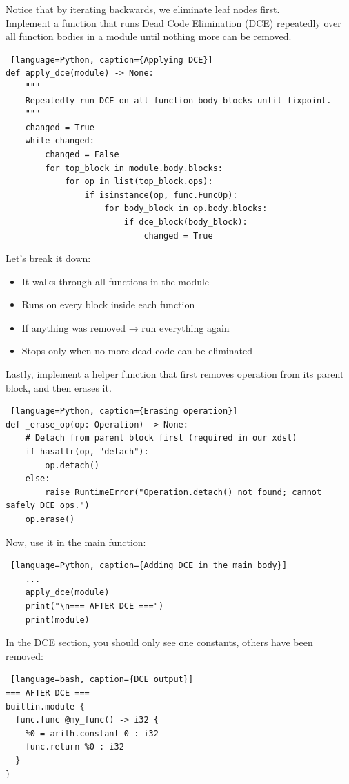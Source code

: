 \documentclass[../main.tex]{subfiles}
\begin{document}
Notice that by iterating backwards, we eliminate leaf nodes first.
\\Implement a function that runs Dead Code Elimination (DCE) repeatedly over all
function bodies in a module until nothing more can be removed.
\begin{lstlisting} [language=Python, caption={Applying DCE}]
def apply_dce(module) -> None:
    """
    Repeatedly run DCE on all function body blocks until fixpoint.
    """
    changed = True
    while changed:
        changed = False
        for top_block in module.body.blocks:
            for op in list(top_block.ops):
                if isinstance(op, func.FuncOp):
                    for body_block in op.body.blocks:
                        if dce_block(body_block):
                            changed = True
\end{lstlisting}
Let’s break it down:
\begin{itemize}
    \item It walks through all functions in the module
    \item Runs  on every block inside each function
    \item If anything was removed → run everything again
    \item Stops only when no more dead code can be eliminated
\end{itemize}
Lastly, implement a helper function that first removes operation from its parent block,
and then erases it.
\begin{lstlisting} [language=Python, caption={Erasing operation}]
def _erase_op(op: Operation) -> None:
    # Detach from parent block first (required in our xdsl)
    if hasattr(op, "detach"):
        op.detach()
    else:
        raise RuntimeError("Operation.detach() not found; cannot safely DCE ops.")
    op.erase()
\end{lstlisting}
Now, use it in the main function:
\begin{lstlisting} [language=Python, caption={Adding DCE in the main body}]
    ...
    apply_dce(module)
    print("\n=== AFTER DCE ===")
    print(module)
\end{lstlisting}
In the DCE section, you should only see one constants, others have been removed:
\begin{lstlisting} [language=bash, caption={DCE output}]
=== AFTER DCE ===
builtin.module {
  func.func @my_func() -> i32 {
    %0 = arith.constant 0 : i32
    func.return %0 : i32
  }
}
\end{lstlisting}
\end{document}
